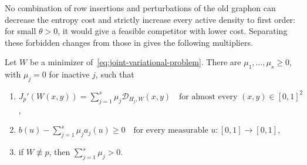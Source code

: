 No combination of row insertions and perturbations of the old graphon
can decrease the entropy cost and strictly increase every active density
to first order: for small $\theta>0$, it would give a feasible
competitor with lower cost. Separating these forbidden changes from
those in  gives the following multipliers.

\begin{lemma}\label{lem:upper-tail-multiplier}
Let $W$ be a minimizer of~\eqref{eq:joint-variational-problem}.
There are $\mu_1,\dots,\mu_s\ge0$, with $\mu_j=0$ for inactive $j$, such that
\begin{enumerate}[label=(\roman*)]
  \item $J_p'(W(x,y))=\sum_{j=1}^s\mu_j\mathcal D_{H_j,W}(x,y) \quad\text{for almost every }(x,y)\in[0,1]^2$,
  \item $b(u)-\sum_{j=1}^s\mu_ja_j(u)\ge0 \quad\text{for every measurable }u:[0,1]\to[0,1]$,
  \item if $W\not\equiv p$, then $\sum_{j=1}^s\mu_j>0$.
\end{enumerate}
\end{lemma}

